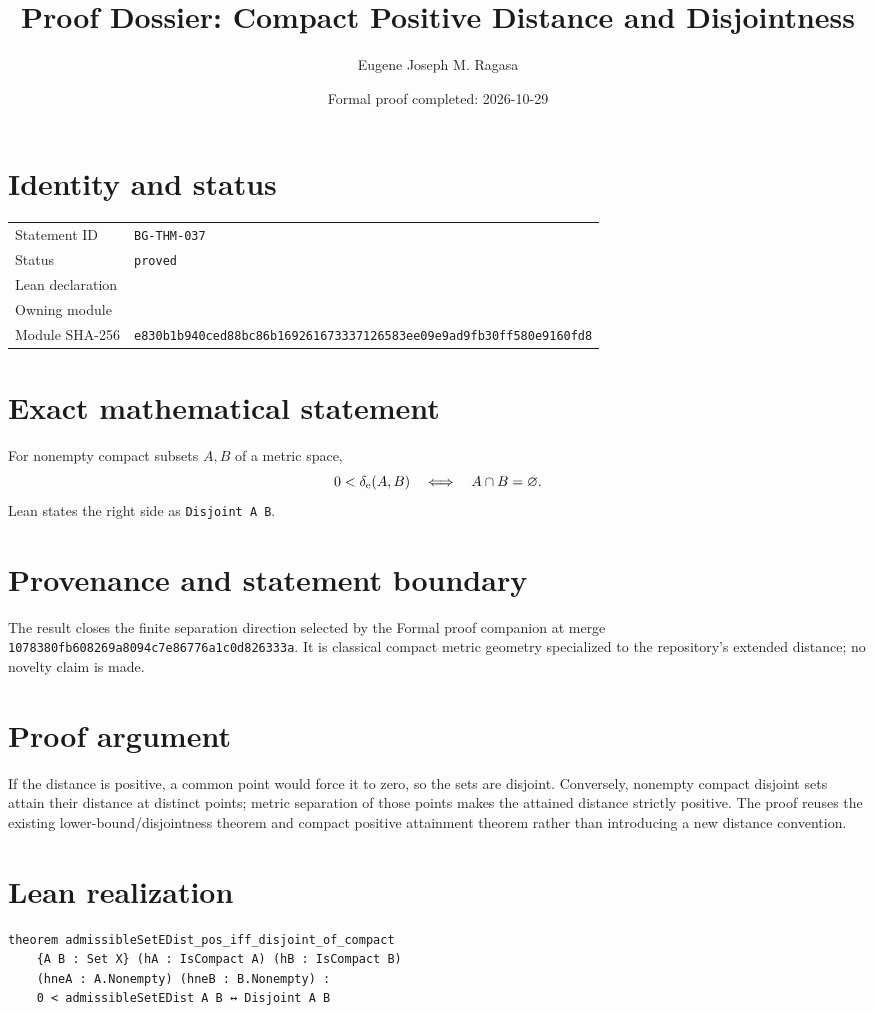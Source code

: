 \documentclass[11pt]{article}
\title{Proof Dossier: Compact Positive Distance and Disjointness}
\author{Eugene Joseph M. Ragasa}
\date{Formal proof completed: 2026-10-29}
\begin{document}
\maketitle
\section{Identity and status}
\begin{tabularx}{\textwidth}{@{}lY@{}}\toprule
Statement ID & \texttt{BG-THM-037} \\
Status & \texttt{proved} \\
Lean declaration &  \\
Owning module &  \\
Module SHA-256 & \texttt{e830b1b940ced88bc86b169261673337126583ee09e9ad9fb30ff580e9160fd8} \\
\bottomrule\end{tabularx}
\section{Exact mathematical statement}
For nonempty compact subsets $A,B$ of a metric space,
\[
  0<\delta_{\rm e}(A,B) \quad\Longleftrightarrow\quad A\cap B=\varnothing.
\]
Lean states the right side as \texttt{Disjoint A B}.
\section{Provenance and statement boundary}
The result closes the finite separation direction selected by the Formal proof companion
at merge \texttt{1078380fb608269a8094c7e86776a1c0d826333a}. It is classical compact
metric geometry specialized to the repository's extended distance; no novelty claim is
made.
\section{Proof argument}
If the distance is positive, a common point would force it to zero, so the sets are
disjoint. Conversely, nonempty compact disjoint sets attain their distance at distinct
points; metric separation of those points makes the attained distance strictly positive.
The proof reuses the existing lower-bound/disjointness theorem and compact positive
attainment theorem rather than introducing a new distance convention.
\section{Lean realization}
\begin{lstlisting}
theorem admissibleSetEDist_pos_iff_disjoint_of_compact
    {A B : Set X} (hA : IsCompact A) (hB : IsCompact B)
    (hneA : A.Nonempty) (hneB : B.Nonempty) :
    0 < admissibleSetEDist A B ↔ Disjoint A B
\end{lstlisting}
\end{document}
